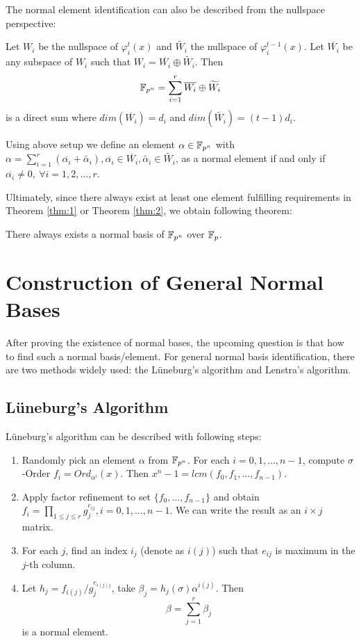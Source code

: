 The normal element identification can also be described from the nullspace perspective:
\begin{Theorem}
\label{thm:2}
Let $W_i$ be the nullspace of $\varphi_{i}^{t} (x)$ and $\widetilde{W_i}$ the
nullspace of $\varphi_{i}^{t-1} (x)$. Let $\overline{W_i}$ be any subspace of
$W_i$ such that $W_i = \overline{W_i}\oplus \widetilde{W_i}$. Then
$${\mathbb{F}}_{p^n} = \displaystyle\sum_{i=1}^{r} \overline{W_i}\oplus \widetilde{W_i}$$
is a direct sum where $dim(\overline{W_i}) = d_i$ and $dim(\widetilde{W_i}) = (t-1)d_i$.

Using above setup we define an element $\alpha \in {\mathbb{F}}_{p^n}$ with 
$\alpha = \sum_{i=1}^{r} (\overline{\alpha_i} + \widetilde{\alpha_i}), \overline{\alpha_i} \in \overline{W_i}, \widetilde{\alpha_i} \in \widetilde{W_i}$,
as a normal element if and only if $\overline{\alpha_i} \neq 0,~ \forall i = 1,2,\dots,r$.
\end{Theorem}

Ultimately, since there always exist at least one element fulfilling requirements in Theorem \ref{thm:1}
or Theorem \ref{thm:2}, we obtain following theorem:
\begin{Theorem}
There always exists a normal basis of ${\mathbb{F}}_{p^n}$ over ${\mathbb{F}}_p$.
\end{Theorem}
\section{Construction of General Normal Bases}
After proving the existence of normal bases, the upcoming question is that how to find such a normal basis/element.
For general normal basis identification, there are two methods widely used: the L\"uneburg's algorithm
and Lenstra's algorithm.

\subsection{L\"uneburg's Algorithm}
L\"uneburg's algorithm can be described with following steps:

\begin{enumerate}[{1)}]
\item Randomly pick an element $\alpha$ from ${\mathbb{F}}_{p^n}$. For each $i = 0,1,\dots,n-1$, 
compute $\sigma$-Order $f_i = Ord_{\alpha^i}(x)$. Then $x^n - 1 = lcm(f_0,f_1,...,f_{n-1})$.
\item Apply factor refinement to set $\{f_0,\dots,f_{n-1}\}$ and obtain $f_i = \prod_{1\leq j\leq r} g_{j}^{e_{ij}}, i = 0,1,\dots,n-1$.
We can write the result as an $i\times j$ matrix.
\item For each $j$, find an index $i_j$ (denote as $i(j)$) such that $e_{ij}$ is maximum in the $j$-th column.
\item Let $h_j = f_{i(j)}/g_{j}^{e_{i(j)j}}$, take $\beta_j = h_j(\sigma)\alpha^{i(j)}$. Then
$$\beta = \displaystyle\sum_{j=1}^{r} \beta_j$$
is a normal element.
\end{enumerate}

